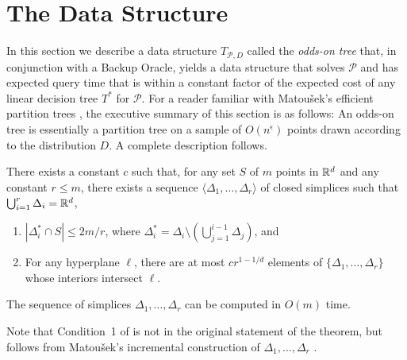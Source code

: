 \documentclass{patmorin}
\begin{document}
\section{The Data Structure}

In this section we describe a data structure $T_{\mathcal{P},D}$ called
the \emph{odds-on tree} that, in conjunction with a Backup Oracle, yields
a data structure that solves $\mathcal{P}$ and has expected query time
that is within a constant factor of the expected cost of any linear
decision tree $T^*$ for $\mathcal{P}$.   For a reader familiar with
Matou\v{s}ek's efficient partition trees \cite{m92},  the executive
summary of this section is as follows: An odds-on tree is essentially
a partition tree on a sample of $O(n^\epsilon)$ points drawn according
to the distribution $D$.  A complete description follows.

\begin{thm}[Matou\v{s}ek 1992]
There exists a constant $c$ such that, for any set $S$ of $m$
points in $\mathbb{R}^d$ and any constant $r\le m$, there exists a sequence
$\langle \Delta_1,\ldots,\Delta_r\rangle$ of closed simplices such that
$\bigcup_{i=1}^r \Delta_i = \mathbb{R}^d$,
  \begin{enumerate}
    \item $|\Delta_i^*\cap S| \le 2m/r$, where $\Delta_i^*=\Delta_i\setminus
    \left(\bigcup_{j=1}^{i-1}\Delta_j\right)$, and
    \item For any hyperplane $\ell$, there are at most $cr^{1-1/d}$ elements of
  $\{\Delta_1,\ldots,\Delta_r\}$ whose interiors intersect $\ell$.
  \end{enumerate}
  The sequence of simplices $\Delta_1,\ldots,\Delta_r$ can be computed
  in $O(m)$ time.
\end{thm}

Note that Condition~1 of  is not in the original
statement of the theorem, but follows from Matou\v{s}ek's incremental
construction of $\Delta_1,\ldots,\Delta_r$ \cite{m92}.
\end{document}
